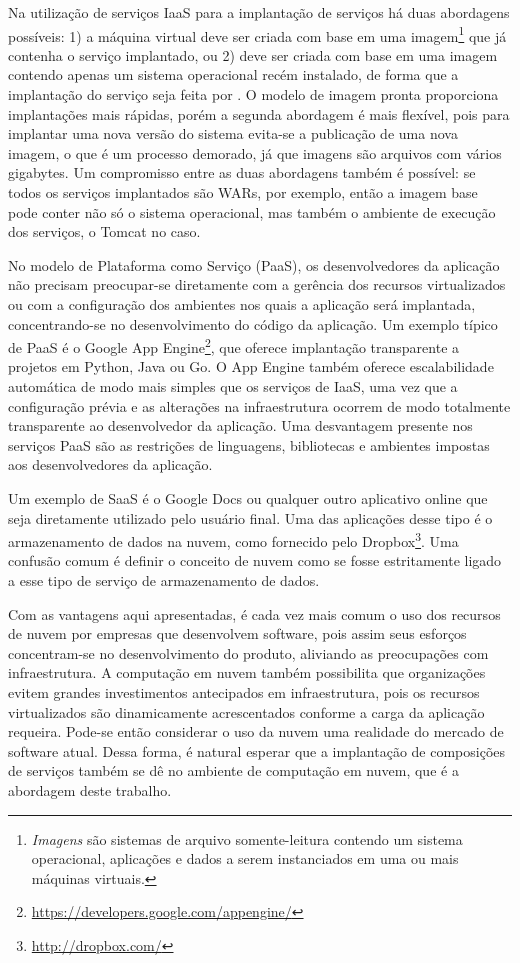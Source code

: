 Na utilização de serviços IaaS para a implantação de serviços há duas abordagens possíveis:
1) a máquina virtual deve ser criada com base em uma 
imagem\footnote{\emph{Imagens} são sistemas de arquivo somente-leitura contendo um sistema operacional, aplicações e dados a serem instanciados em uma ou mais máquinas virtuais.} 
que já contenha
o serviço implantado, ou 2) deve ser criada com base em uma imagem contendo apenas um
sistema operacional recém instalado, de forma que a implantação do serviço seja feita
por \scripts. O modelo de imagem pronta proporciona implantações mais rápidas,
porém a segunda abordagem é mais flexível, pois para implantar uma nova versão do sistema
evita-se a publicação de uma nova imagem, o que é um processo demorado,
já que imagens são arquivos com vários gigabytes.
Um compromisso entre as duas abordagens também é possível:
se todos os serviços implantados são WARs, por exemplo, então a imagem base
pode conter não só o sistema operacional, mas também o ambiente de execução
dos serviços, o Tomcat no caso.

No modelo de Plataforma como Serviço (PaaS), os desenvolvedores da aplicação não precisam preocupar-se diretamente com a gerência dos recursos virtualizados ou com a configuração dos ambientes nos quais a aplicação será implantada, concentrando-se no desenvolvimento do código da aplicação.
Um exemplo típico de PaaS é o Google App Engine\footnote{\url{https://developers.google.com/appengine/}}, que oferece implantação transparente a projetos em Python, Java ou Go. O App Engine também oferece escalabilidade automática de modo mais simples que os serviços de IaaS, uma vez que a configuração prévia e as alterações na infraestrutura ocorrem de modo totalmente transparente ao desenvolvedor da aplicação. Uma desvantagem presente nos serviços PaaS são as restrições de linguagens, bibliotecas e ambientes impostas aos desenvolvedores da aplicação.

Um exemplo de SaaS é o Google Docs ou qualquer outro aplicativo online que seja diretamente utilizado pelo usuário final. Uma das aplicações desse tipo é o armazenamento de dados na nuvem, como fornecido pelo Dropbox\footnote{\url{http://dropbox.com/}}. Uma confusão comum é definir o conceito de nuvem como se fosse estritamente ligado a esse tipo de serviço de armazenamento de dados.

Com as vantagens aqui apresentadas, é cada vez mais comum o uso dos recursos de nuvem por empresas que desenvolvem software, pois assim seus esforços concentram-se no desenvolvimento do produto, aliviando as preocupações com infraestrutura. A computação em nuvem também possibilita que organizações evitem grandes investimentos antecipados em infraestrutura, pois os recursos virtualizados são dinamicamente acrescentados conforme a carga da aplicação requeira. Pode-se então considerar o uso da nuvem uma realidade do mercado de software atual. Dessa forma, é natural esperar que a implantação de composições de serviços também se dê no ambiente de computação em nuvem, que é a abordagem deste trabalho. 

